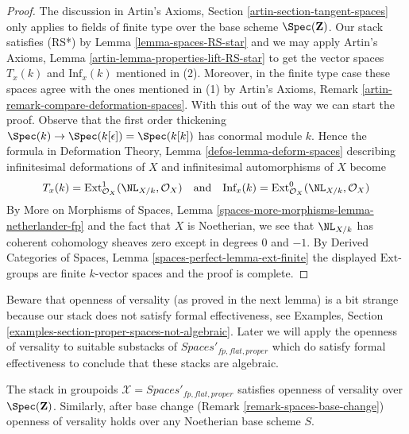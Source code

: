 \begin{proof}
The discussion in Artin's Axioms, Section \ref{artin-section-tangent-spaces}
only applies to fields of finite type over the base scheme $\Spec(\mathbf{Z})$.
Our stack satisfies (RS*) by Lemma \ref{lemma-spaces-RS-star}
and we may apply
Artin's Axioms, Lemma \ref{artin-lemma-properties-lift-RS-star}
to get the vector spaces $T_x(k)$ and $\text{Inf}_x(k)$
mentioned in (2). Moreover, in the finite type case these spaces agree with the
ones mentioned in (1)
by Artin's Axioms, Remark \ref{artin-remark-compare-deformation-spaces}.
With this out of the way we can start the proof.
Observe that the first order thickening
$\Spec(k) \to \Spec(k[\epsilon]) = \Spec(k[k])$
has conormal module $k$. Hence the formula in
Deformation Theory, Lemma \ref{defos-lemma-deform-spaces}
describing infinitesimal deformations of $X$ and infinitesimal
automorphisms of $X$ become
$$
T_x(k) = \text{Ext}^1_{\mathcal{O}_X}(\NL_{X/k}, \mathcal{O}_X)
\quad\text{and}\quad
\text{Inf}_x(k) = \text{Ext}^0_{\mathcal{O}_X}(\NL_{X/k}, \mathcal{O}_X)
$$
By More on Morphisms of Spaces, Lemma
\ref{spaces-more-morphisms-lemma-netherlander-fp}
and the fact that $X$ is Noetherian, we see that
$\NL_{X/k}$ has coherent cohomology sheaves zero except
in degrees $0$ and $-1$.
By Derived Categories of Spaces, Lemma \ref{spaces-perfect-lemma-ext-finite}
the displayed $\text{Ext}$-groups are finite $k$-vector spaces
and the proof is complete.
\end{proof}

\noindent
Beware that openness of versality (as proved in the next lemma)
is a bit strange because our stack does not satisfy formal effectiveness, see
Examples, Section \ref{examples-section-proper-spaces-not-algebraic}.
Later we will apply the openness of versality to suitable substacks of
$\textit{Spaces}'_{fp, flat, proper}$ which do satisfy
formal effectiveness to conclude that these stacks are algebraic.

\begin{lemma}
\label{lemma-spaces-defo-thy}
The stack in groupoids $\mathcal{X} = \textit{Spaces}'_{fp, flat, proper}$
satisfies openness of versality over $\Spec(\mathbf{Z})$.
Similarly, after base change (Remark \ref{remark-spaces-base-change})
openness of versality holds over any Noetherian base scheme $S$.
\end{lemma}

